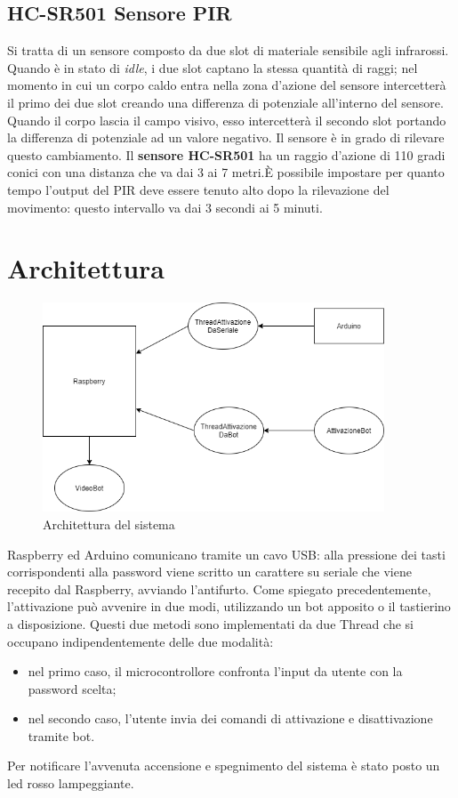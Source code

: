 \documentclass[12pt]{article}
\begin{document}
	\subsection{HC-SR501 Sensore PIR}
	Si tratta di un sensore composto da due slot di materiale sensibile agli infrarossi.
	Quando è in stato di \textit{idle}, i due slot captano la stessa quantità di raggi; 
	nel momento in cui un corpo caldo entra nella zona d'azione del sensore intercetterà il primo 
	dei due slot creando una differenza di potenziale all'interno del sensore. Quando il corpo lascia
	il campo visivo, esso intercetterà il secondo slot portando la differenza di potenziale ad un 
	valore negativo. Il sensore è in grado di rilevare questo cambiamento. Il 
	\textbf{sensore HC-SR501} ha un raggio d'azione di 110 gradi conici con una distanza che va dai 
	3 ai 7 metri.È possibile impostare per quanto tempo l'output del PIR deve essere tenuto alto dopo 
	la rilevazione del movimento: questo intervallo va dai 3 secondi ai 5 minuti.

	\section{Architettura}
	\begin{figure}[h]
		\centering
		\includegraphics[width=4.0in]{architettura}
		\caption{Architettura del sistema}
	\end{figure}
	
	Raspberry ed Arduino comunicano tramite un cavo USB: alla pressione dei tasti corrispondenti 
	alla password viene scritto un carattere su seriale che viene recepito dal Raspberry, avviando 
	l'antifurto. Come spiegato precedentemente, l'attivazione può avvenire in due modi, 
	utilizzando un bot apposito o il tastierino a disposizione. Questi due metodi sono implementati 
	da due Thread che si occupano indipendentemente delle due modalità:
	\begin{itemize}
		\item nel primo caso, il microcontrollore confronta l'input da utente con la password scelta;
		\item nel secondo caso, l'utente invia dei comandi di attivazione e disattivazione tramite 
		bot.
	\end{itemize}
	Per notificare l'avvenuta accensione e spegnimento del sistema è stato posto un led rosso 
	lampeggiante.
	\newpage
\end{document}
